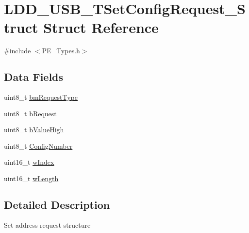 \hypertarget{struct_l_d_d___u_s_b___t_set_config_request___struct}{\section{L\-D\-D\-\_\-\-U\-S\-B\-\_\-\-T\-Set\-Config\-Request\-\_\-\-Struct Struct Reference}
\label{struct_l_d_d___u_s_b___t_set_config_request___struct}
}


{\ttfamily \#include $<$P\-E\-\_\-\-Types.\-h$>$}

\subsection*{Data Fields}
\begin{DoxyCompactItemize}
\item 
uint8\-\_\-t \hyperlink{struct_l_d_d___u_s_b___t_set_config_request___struct_aa3e4ca8e83424e5496478991dac0361a}{bm\-Request\-Type}
\item 
uint8\-\_\-t \hyperlink{struct_l_d_d___u_s_b___t_set_config_request___struct_a12a9d3e8bd01f75b681c1749d2595f42}{b\-Request}
\item 
uint8\-\_\-t \hyperlink{struct_l_d_d___u_s_b___t_set_config_request___struct_a55df59e0060cfd0bc6e9bdc53b9a0d99}{b\-Value\-High}
\item 
uint8\-\_\-t \hyperlink{struct_l_d_d___u_s_b___t_set_config_request___struct_a9a545d7858a7ee85dbe37eaf2b4b7e01}{Config\-Number}
\item 
uint16\-\_\-t \hyperlink{struct_l_d_d___u_s_b___t_set_config_request___struct_ad2aa2851b128777e842b2ac796d2f664}{w\-Index}
\item 
uint16\-\_\-t \hyperlink{struct_l_d_d___u_s_b___t_set_config_request___struct_a66312977eb5816459d0201a2bacaf9b5}{w\-Length}
\end{DoxyCompactItemize}


\subsection{Detailed Description}
Set address request structure 

